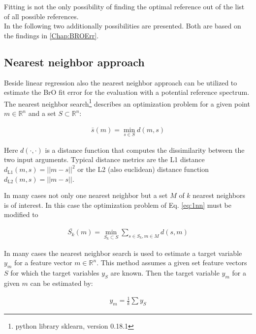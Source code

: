 \documentclass  [
  paper    = a4,
  BCOR     = 10mm,
  twoside,
  fontsize = 12pt,
  fleqn,
  toc      = bibnumbered,
  toc      = listofnumbered,
  numbers  = noendperiod,
  headings = normal,
  listof   = leveldown,
  version  = 3.03
]                                       {scrreprt}
\begin{document}
	Fitting is not the only possibility of finding the optimal reference out of the list of all possible references.\\
	In the following two additionally possibilities are presented. Both are based on the findings in \cref{Chap:BROErr}. 

\subsection{Nearest neighbor approach}


Beside linear regression also the nearest neighbor approach can be utilized to estimate the BrO fit error for the evaluation with a potential reference spectrum.
%
The nearest neighbor search\footnote{python library sklearn, version 0.18.1} describes an optimization problem for a given point $m \in \mathbb{R}^n$ and a set $S \subset \mathbb{R}^n$:

%

\begin{align}
\bar{s}(m) = \min_{s \in S} d(m, s) \label{eq:1nn}
\end{align}

%
Here $d(\cdot, \cdot)$ is a distance function that computes the dissimilarity between the two input arguments. Typical distance metrics are the L1 distance $d_{\text{L1} 	
}(m, s) = ||m - s||^2$ or the L2 (also euclidean) distance function $d_{\text{L2} 
}(m, s) = ||m - s||$. 


In many cases not only one nearest neighbor but a set $M$ of $k$ nearest neighbors is of interest. In this case the optimization problem of Eq. \ref{eq:1nn} must be modified to

%

\begin{align}
\bar{S_k}(m) = \min_{S_k \subset S} \sum_{s \in S_k, m \in M} d(s, m) \label{eq:knn}
\end{align}

%

In many cases the nearest neighbor search is used to estimate a target variable $y_m$ for a feature vector $m \in \mathbb{R}^n$. This method assumes a given set feature vectors $S$ for which the target variables $y_S$ are known. Then the target variable $y_m$ for a given $m$ can be estimated by:

%

\begin{align}
y_m = \frac{1}{k} \sum y_S \label{eq:knn_regression}
\end{align}
\end{document}
